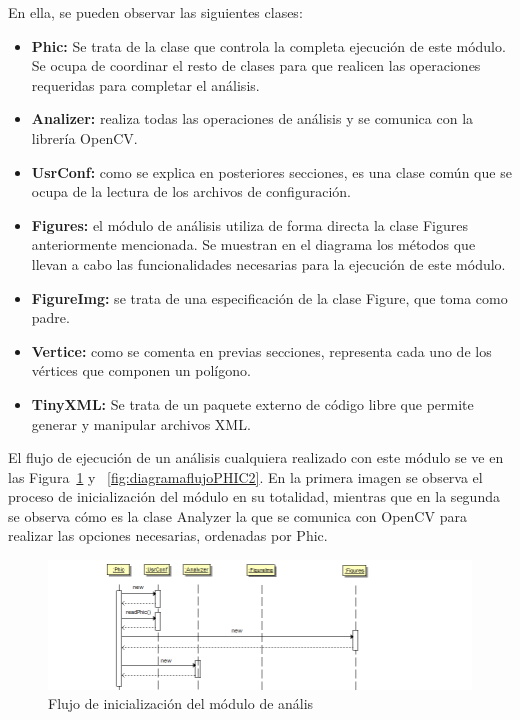 En ella, se pueden observar las siguientes clases:\\

\begin{itemize}

	\item \textbf{Phic:} Se trata de la clase que controla la completa ejecución de este módulo. Se ocupa de coordinar el resto de clases para que realicen las operaciones requeridas para completar el análisis.
	
	\item \textbf{Analizer:} realiza todas las operaciones de análisis y se comunica con la librería OpenCV.
	
	\item \textbf{UsrConf:} como se explica en posteriores secciones, es una clase común que se ocupa de la lectura de los archivos de configuración.
	
	\item \textbf{Figures:} el módulo de análisis utiliza de forma directa la clase Figures anteriormente mencionada. Se muestran en el diagrama los métodos que llevan a cabo las funcionalidades necesarias para la ejecución de este módulo.
	
	\item \textbf{FigureImg:} se trata de una especificación de la clase Figure, que toma como padre.
	
	\item \textbf{Vertice:} como se comenta en previas secciones, representa cada uno de los vértices que componen un polígono. 
	
	\item \textbf{TinyXML:} Se trata de un paquete externo de código libre que permite generar y manipular archivos XML.
	
	
\end{itemize}
			
El flujo de ejecución de un análisis cualquiera realizado con este módulo se ve en las Figura~\ref{fig:diagramaflujoPHIC1} y ~\ref{fig:diagramaflujoPHIC2}. En la primera imagen se observa el proceso de inicialización del módulo en su totalidad, mientras que en la segunda se observa cómo es la clase Analyzer la que se comunica con OpenCV para realizar las opciones necesarias, ordenadas por Phic.\\

		\begin{figure}[htbp]
		\centering
		\includegraphics[scale=0.47]{graphics/diagramaflujoPHIC1.png}
		\caption{Flujo de inicialización del módulo de anális}
		\label{fig:diagramaflujoPHIC1}
		\end{figure}
		
